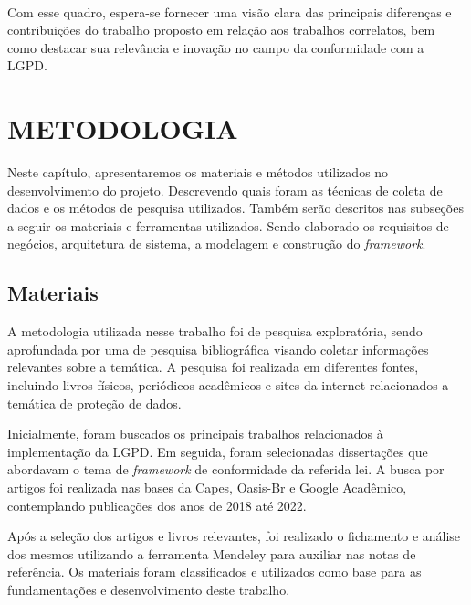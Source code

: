 \documentclass[
	12pt,				%
	openright,			%
	oneside,			%
	a4paper,			%
	english,			%
	french,				%
	spanish,			%
	brazil,				%
	]{abntex2}
\begin{document}
\\

Com esse quadro, espera-se fornecer uma visão clara das principais diferenças e contribuições do trabalho proposto em relação aos trabalhos correlatos, bem como destacar sua relevância e inovação no campo da conformidade com a LGPD.






\chapter{METODOLOGIA}
\label{ch: materiais e métodos}

Neste capítulo, apresentaremos os materiais e métodos utilizados no desenvolvimento do projeto. Descrevendo quais foram as técnicas de coleta de dados e os métodos de pesquisa utilizados. Também serão descritos nas subseções a seguir os materiais e ferramentas utilizados. Sendo elaborado os requisitos de negócios, arquitetura de sistema, a modelagem e construção do \textit{framework}. 


\section{Materiais}

A metodologia utilizada nesse trabalho foi de pesquisa exploratória, sendo aprofundada por uma de pesquisa bibliográfica visando coletar informações relevantes sobre a temática. A pesquisa foi realizada em diferentes fontes, incluindo livros físicos, periódicos acadêmicos e sites da internet relacionados a temática de proteção de dados.

Inicialmente, foram buscados os principais trabalhos relacionados à implementação da LGPD. Em seguida, foram selecionadas dissertações que abordavam o tema de \textit{framework} de conformidade da referida lei. A busca por artigos foi realizada nas bases da Capes, Oasis-Br e Google Acadêmico, contemplando publicações dos anos de 2018 até 2022.

Após a seleção dos artigos e livros relevantes, foi realizado o fichamento e análise dos mesmos utilizando a ferramenta Mendeley para auxiliar nas notas de referência. Os materiais foram classificados e utilizados como base para as fundamentações e desenvolvimento deste trabalho.
\end{document}
